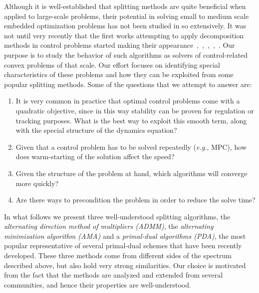 \documentclass[openany]{now}
\newcommand{\eg}{{\it e.g.}}
\begin{document}
Although it is well-established that splitting methods are quite beneficial when applied to large-scale problems, their potential in solving small to medium scale embedded optimization problems has not been studied in so extensively. It was not until very recently that the first works attempting to apply decomposition methods in control problems started making their appearance~\cite{soc},~\cite{ghadimi2013optimal},~\cite{giselsson2014metric},~\cite{Giselsson:fbds},~\cite{patrinos2014accelerated}. Our purpose is to study the behavior of such algorithms as solvers of control-related convex problems of that scale. Our effort focuses on identifying special characteristics of these problems and how they can be exploited from some popular splitting methods. Some of the questions that we attempt to answer are:
\begin{enumerate}
\item It is very common in practice that optimal control problems come with a quadratic objective, since in this way stability can be proven for regulation or tracking purposes. What is the best way to exploit this smooth term, along with the special structure of the dynamics equation?
\item Given that a control problem has to be solved repeatedly (\eg, MPC), how does warm-starting of the solution affect the speed? 
\item Given the structure of the problem at hand, which algorithms will converge more quickly?
\item Are there ways to precondition the problem in order to reduce the solve time? 
\end{enumerate}

In what follows we present three well-understood splitting algorithms, the \emph{alternating direction method of multipliers (ADMM)}, the \emph{alternating minimization algorithm (AMA)} and a \emph{primal-dual algorithms (PDA)}, the most popular representative of several primal-dual schemes that have been recently developed. These three methods come from different sides of the spectrum described above, but also hold very strong similarities. Our choice is motivated from the fact that the methods are analyzed and extended from several communities, and hence their properties are well-understood.\\
\end{document}
